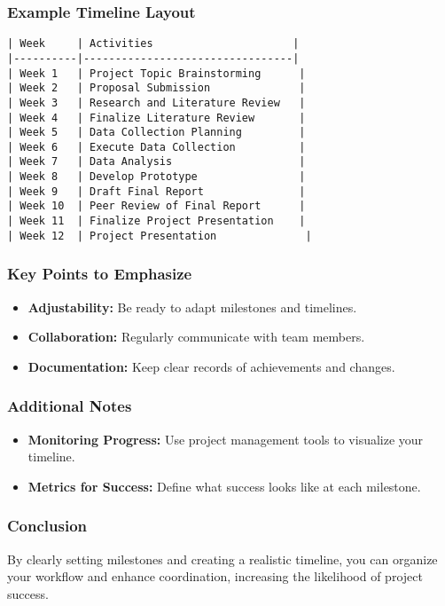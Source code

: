 \documentclass[aspectratio=169]{beamer}
\begin{document}
\begin{frame}[fragile]
    \frametitle{Example Timeline Layout}
    \begin{lstlisting}[basicstyle=\tiny\ttfamily]
| Week     | Activities                      |
|----------|---------------------------------|
| Week 1   | Project Topic Brainstorming      |
| Week 2   | Proposal Submission              |
| Week 3   | Research and Literature Review   |
| Week 4   | Finalize Literature Review       |
| Week 5   | Data Collection Planning         |
| Week 6   | Execute Data Collection          |
| Week 7   | Data Analysis                    |
| Week 8   | Develop Prototype                |
| Week 9   | Draft Final Report               |
| Week 10  | Peer Review of Final Report      |
| Week 11  | Finalize Project Presentation    |
| Week 12  | Project Presentation              |
    \end{lstlisting}
\end{frame}

\begin{frame}[fragile]
    \frametitle{Key Points to Emphasize}
    \begin{itemize}
        \item \textbf{Adjustability:} Be ready to adapt milestones and timelines.
        \item \textbf{Collaboration:} Regularly communicate with team members.
        \item \textbf{Documentation:} Keep clear records of achievements and changes.
    \end{itemize}
\end{frame}

\begin{frame}[fragile]
    \frametitle{Additional Notes}
    \begin{itemize}
        \item \textbf{Monitoring Progress:} Use project management tools to visualize your timeline.
        \item \textbf{Metrics for Success:} Define what success looks like at each milestone.
    \end{itemize}
\end{frame}

\begin{frame}[fragile]
    \frametitle{Conclusion}
    By clearly setting milestones and creating a realistic timeline, you can organize your workflow and enhance coordination, increasing the likelihood of project success.
\end{frame}
\end{document}
